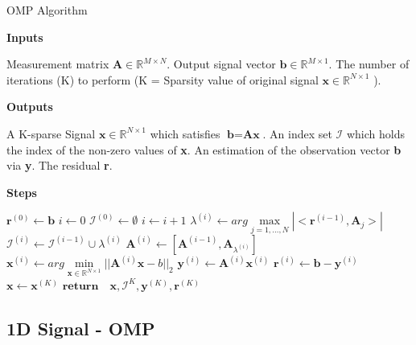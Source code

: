 \documentclass[titlepage,oneside, 12pt]{book}
\theoremstyle{break}
\begin{document}
\begin{algorithm}[H]
  \caption{OMP Algorithm}
  \bigskip	
  \textbf{Inputs}%
  \begin{algorithmic}[1]
    \State Measurement matrix $\textbf{A} \in \mathbb{R}^{M \times N}$.
    \State Output signal vector $\textbf{b} \in \mathbb{R}^{M \times 1}$.
    \State The number of iterations (K) to perform (K = Sparsity value of original signal $\textbf{x} \in \mathbb{R}^{N \times 1}$ ). 
  \end{algorithmic}
  \bigskip  
  \textbf{Outputs}%
  \begin{algorithmic}[1]
    \State A K-sparse Signal $\textbf{x}\in \mathbb{R}^{N \times 1}$ which satisfies $\textbf{b} = \textbf{A}\textbf{x}$.
     \State An index set $\pmb{\mathcal{I}}$ which holds the index of the non-zero values of \textbf{x}. 
      \State An estimation of the observation vector \textbf{b} via \textbf{y}. 
       \State The residual \textbf{r}. 
  \end{algorithmic}
  \bigskip
  \textbf{Steps}%
  \begin{algorithmic}[1]
\State $\textbf{r}^{(0)} \gets \textbf{b}$
\State $i \gets 0$
   \State $\pmb{\mathcal{I}}^{(0)} \gets \emptyset$
   \State $i \gets i + 1$
   \State $\lambda^{(i)} \gets arg \underset{j = 1,\hdots,N}\max |<\textbf{r}^{(i - 1)}, \textbf{A}_{j}>|$ 
   \State $\pmb{\mathcal{I}}^{(i)} \gets \pmb{\mathcal{I}}^{(i-1)} \cup \lambda^{(i)}$ 
   \State $\textbf{A}^{(i)} \gets [\textbf{A}^{(i - 1)}, \textbf{A}_{\lambda^{(i)}}]$
   \State $\textbf{x}^{(i)} \gets arg \underset{\textbf{x} \in \mathbb{R}^{N \times 1}}\min ||\textbf{A}^{(i)}\textbf{x} - b||_2$  
   \State $\textbf{y}^{(i)} \gets \textbf{A}^{(i)}\textbf{x}^{(i)}$
   \State $\textbf{r}^{(i)} \gets \textbf{b} - \textbf{y}^{(i)} $
   \EndWhile
    \State $\textbf{x} \gets \textbf{x}^{(K)}$
   \State $\textbf{return} \quad \textbf{x},\pmb{\mathcal{I}}^{K}, \textbf{y}^{(K)}, \textbf{r}^{(K)}$ 
   \EndProcedure
  \end{algorithmic}
  \end{algorithm}
  
\newpage


\subsection{1D Signal - OMP}
\end{document}
